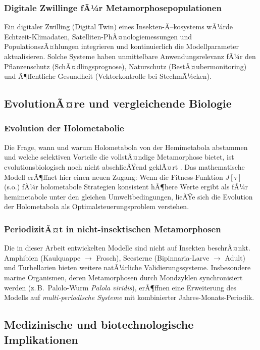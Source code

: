 ﻿\documentclass[12pt, a4paper]{article}
\theoremstyle{definition}
\begin{document}
\subsubsection{Digitale Zwillinge fÃ¼r Metamorphosepopulationen}
Ein digitaler Zwilling (Digital Twin) eines Insekten-Ã–kosystems wÃ¼rde
Echtzeit-Klimadaten, Satelliten-PhÃ¤nologiemessungen und PopulationszÃ¤hlungen
integrieren und kontinuierlich die Modellparameter aktualisieren. Solche Systeme
haben unmittelbare Anwendungsrelevanz fÃ¼r den Pflanzenschutz (SchÃ¤dlingsprognose),
Naturschutz (BestÃ¤ubermonitoring) und Ã¶ffentliche Gesundheit (Vektorkontrolle
bei StechmÃ¼cken).

\subsection{EvolutionÃ¤re und vergleichende Biologie}

\subsubsection{Evolution der Holometabolie}
Die Frage, wann und warum Holometabola von der Hemimetabola abstammen und welche
selektiven Vorteile die vollstÃ¤ndige Metamorphose bietet, ist evolutionsbiologisch
noch nicht abschlieÃŸend geklÃ¤rt \cite{Truman2019}. Das mathematische Modell erÃ¶ffnet
hier einen neuen Zugang: Wenn die Fitness-Funktion $J[\tau]$ (s.o.) fÃ¼r
holometabole Strategien konsistent hÃ¶here Werte ergibt als fÃ¼r hemimetabole unter
den gleichen Umweltbedingungen, lieÃŸe sich die Evolution der Holometabola als
Optimalsteuerungsproblem verstehen.

\subsubsection{PeriodizitÃ¤t in nicht-insektischen Metamorphosen}
Die in dieser Arbeit entwickelten Modelle sind nicht auf Insekten beschrÃ¤nkt.
Amphibien (Kaulquappe $\to$ Frosch), Seesterne (Bipinnaria-Larve $\to$ Adult)
und Turbellarien bieten weitere natÃ¼rliche Validierungssysteme. Insbesondere
marine Organismen, deren Metamorphosen durch Mondzyklen synchronisiert werden
(z.\,B.\ Palolo-Wurm \emph{Palola viridis}), erÃ¶ffnen eine Erweiterung des
Modells auf \emph{multi-periodische Systeme} mit kombinierter Jahres-Monats-Periodik.

\subsection{Medizinische und biotechnologische Implikationen}
\end{document}
